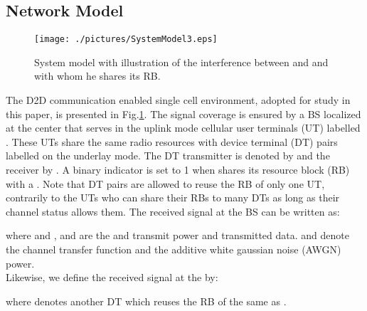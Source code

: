 \documentclass[conference,onecolumn,12pt]{IEEEtran}
\begin{document}
\subsection{Network Model}
\begin{figure}
\centering
\texttt{[image: ./pictures/SystemModel3.eps]}
\caption{System model with illustration of the interference between  and  and  with whom he shares its RB. }\label{SystemModel3}
\end{figure}
The D2D communication enabled single cell environment, adopted for study in this paper, is presented in Fig.\ref{SystemModel3}. The signal coverage is ensured by a BS localized at the center that serves in the uplink mode  cellular user terminals (UT) labelled . These UTs share the same radio resources with  device terminal (DT) pairs labelled  on the underlay mode. The DT transmitter is denoted by  and the receiver by . A binary indicator  is set to 1 when  shares its resource block (RB) with a . Note that DT pairs are allowed to reuse the RB of only one UT, contrarily to the UTs who can share their RBs to many DTs as long as their channel status allows them.
The received signal at the BS can be written as:

where  and ,  and  are the  and  transmit power and transmitted data.  and  denote the channel  transfer function and the additive white gaussian noise (AWGN) power. \\
Likewise, we define the received signal at the  by:

where  denotes another DT which reuses the RB of the same  as .
\end{document}
